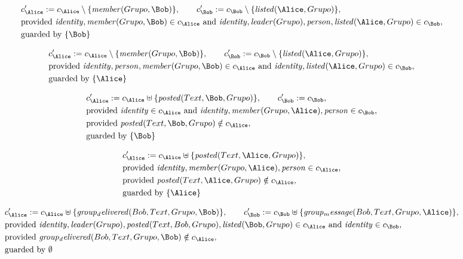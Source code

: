 \fi
\begin{align*}
&
c'_
{
\Alice
}
 := 
c_
{
\Alice
}
 \setminus 
\{
\mathit{
member
}
(
Grupo
,
\Bob
)
\}
, \qquad 
c'_
{
\Bob
}
 := 
c_
{
\Bob
}
 \setminus 
\{
\mathit{
listed
}
(
\Alice
,
Grupo
)
\}
,\\
&
\text{provided } 
\mathit{
identity
}
,
\mathit{
member
}
(
Grupo
,
\Bob
)
 \in c_
{
\Alice
}
 \text{ and } 
\mathit{
identity
}
,
\mathit{
leader
}
(
Grupo
)
,
\mathit{
person
}
,
\mathit{
listed
}
(
\Alice
,
Grupo
)
 \in c_
{
\Bob
}
,\\
&
\text{guarded by } \{
\Bob
\}
\end{align*}

\begin{align*}
&
c'_
{
\Alice
}
 := 
c_
{
\Alice
}
 \setminus 
\{
\mathit{
member
}
(
Grupo
,
\Bob
)
\}
, \qquad 
c'_
{
\Bob
}
 := 
c_
{
\Bob
}
 \setminus 
\{
\mathit{
listed
}
(
\Alice
,
Grupo
)
\}
,\\
&
\text{provided } 
\mathit{
identity
}
,
\mathit{
person
}
,
\mathit{
member
}
(
Grupo
,
\Bob
)
 \in c_
{
\Alice
}
 \text{ and } 
\mathit{
identity
}
,
\mathit{
listed
}
(
\Alice
,
Grupo
)
 \in c_
{
\Bob
}
,\\
&
\text{guarded by } \{
\Alice
\}
\end{align*}

\begin{align*}
&
c'_
{
\Alice
}
 := 
c_
{
\Alice
}
 \uplus 
\{
\mathit{
posted
}
(
Text
,
\Bob
,
Grupo
)
\}
, \qquad 
c'_
{
\Bob
}
 := 
c_
{
\Bob
}
,\\
&
\text{provided } 
\mathit{
identity
}
 \in c_
{
\Alice
}
 \text{ and } 
\mathit{
identity
}
,
\mathit{
member
}
(
Grupo
,
\Alice
)
,
\mathit{
person
}
 \in c_
{
\Bob
}
,\\
&
\text{provided } 
\mathit{
posted
}
(
Text
,
\Bob
,
Grupo
)
 \notin c_
{
\Alice
}
,\\
&
\text{guarded by } \{
\Bob
\}
\end{align*}

\begin{align*}
&
c'_
{
\Alice
}
 := 
c_
{
\Alice
}
 \uplus 
\{
\mathit{
posted
}
(
Text
,
\Alice
,
Grupo
)
\}
,\\
&
\text{provided } 
\mathit{
identity
}
,
\mathit{
member
}
(
Grupo
,
\Alice
)
,
\mathit{
person
}
 \in c_
{
\Alice
}
,\\
&
\text{provided } 
\mathit{
posted
}
(
Text
,
\Alice
,
Grupo
)
 \notin c_
{
\Alice
}
,\\
&
\text{guarded by } \{
\Alice
\}
\end{align*}

\begin{align*}
&
c'_
{
\Alice
}
 := 
c_
{
\Alice
}
 \uplus 
\{
\mathit{
group_delivered
}
(
Bob
,
Text
,
Grupo
,
\Bob
)
\}
, \qquad 
c'_
{
\Bob
}
 := 
c_
{
\Bob
}
 \uplus 
\{
\mathit{
group_message
}
(
Bob
,
Text
,
Grupo
,
\Alice
)
\}
,\\
&
\text{provided } 
\mathit{
identity
}
,
\mathit{
leader
}
(
Grupo
)
,
\mathit{
posted
}
(
Text
,
Bob
,
Grupo
)
,
\mathit{
listed
}
(
\Bob
,
Grupo
)
 \in c_
{
\Alice
}
 \text{ and } 
\mathit{
identity
}
 \in c_
{
\Bob
}
,\\
&
\text{provided } 
\mathit{
group_delivered
}
(
Bob
,
Text
,
Grupo
,
\Bob
)
 \notin c_
{
\Alice
}
,\\
&
\text{guarded by } \emptyset
\end{align*}
